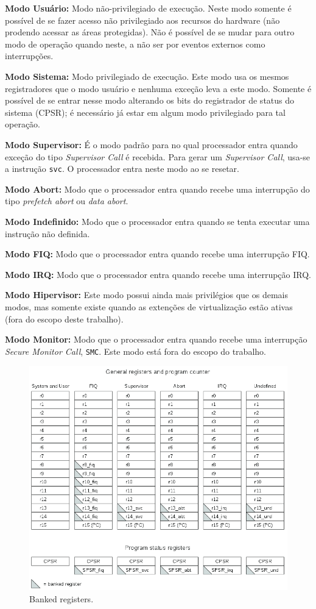\documentclass{ufscThesis/ufscThesis} %
\begin{document}
\textbf{Modo Usuário:} Modo não-privilegiado de execução. Neste modo somente é possível de se fazer acesso não privilegiado aos recursos do hardware (não prodendo acessar as áreas protegidas). Não é possível de se mudar para outro modo de operação quando neste, a não ser por eventos externos como interrupções.

\textbf{Modo Sistema:} Modo privilegiado de execução. Este modo usa os mesmos registradores que o modo usuário e nenhuma exceção leva a este modo. Somente é possível de se entrar nesse modo alterando os bits do registrador de status do sistema (CPSR); é necessário já estar em algum modo privilegiado para tal operação.

\textbf{Modo Supervisor:} É o modo padrão para no qual processador entra quando exceção do tipo \emph{Supervisor Call} é recebida.
Para gerar um \emph{Supervisor Call}, usa-se a instrução \verb+svc+. O processador entra neste modo ao se resetar.

\textbf{Modo Abort:} Modo que o processador entra quando recebe uma interrupção do tipo \emph{prefetch abort} ou \emph{data abort}.

\textbf{Modo Indefinido:} Modo que o processador entra quando se tenta executar uma instrução não definida.

\textbf{Modo FIQ:} Modo que o processador entra quando recebe uma interrupção FIQ.

\textbf{Modo IRQ:} Modo que o processador entra quando recebe uma interrupção IRQ.

\textbf{Modo Hipervisor:} Este modo possui ainda mais privilégios que os demais modos, mas somente existe quando as extenções de virtualização estão ativas (fora do escopo deste trabalho).

\textbf{Modo Monitor:} Modo que o processador entra quando recebe uma interrupção \emph{Secure Monitor Call}, \verb+SMC+. Este modo está fora do escopo do trabalho.


\begin{figure}[ht!]
	\centerline{
    \includegraphics[width=12cm]{figuras/banked_registers}
	}
    \caption{Banked registers.}
\end{figure}
\end{document}

